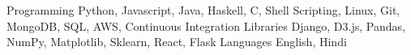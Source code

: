 
\begin{cvskills}

  \cvskill
    {Programming}
    {Python, Javascript, Java, Haskell, C, Shell Scripting, Linux, Git, MongoDB, SQL, AWS, Continuous Integration}
  \cvskill
    {Libraries}
    {Django, D3.js, Pandas, NumPy, Matplotlib, Sklearn, React, Flask}
  \cvskill
    {Languages}
    {English, Hindi}
\end{cvskills}

